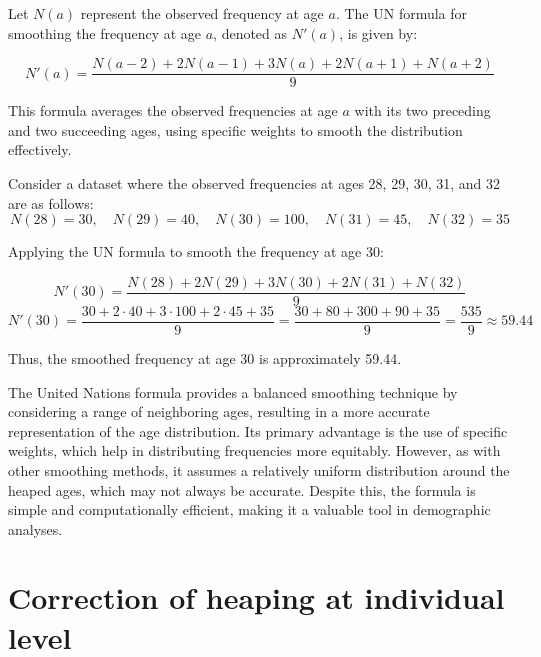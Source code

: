 \documentclass[pdflatex,sn-mathphys-num]{sn-jnl}%
\theoremstyle{thmstyleone}%
\theoremstyle{thmstyletwo}%
\theoremstyle{thmstylethree}%
\begin{document}
Let \( N(a) \) represent the observed frequency at age \( a \). The UN formula for smoothing the frequency at age \( a \), denoted as \( N'(a) \), is given by:

\[
N'(a) = \frac{N(a-2) + 2N(a-1) + 3N(a) + 2N(a+1) + N(a+2)}{9}
\]

This formula averages the observed frequencies at age \( a \) with its two preceding and two succeeding ages, using specific weights to smooth the distribution effectively.

Consider a dataset where the observed frequencies at ages 28, 29, 30, 31, and 32 are as follows:
\[
N(28) = 30, \quad N(29) = 40, \quad N(30) = 100, \quad N(31) = 45, \quad N(32) = 35
\]

Applying the UN formula to smooth the frequency at age 30:

\[
N'(30) = \frac{N(28) + 2N(29) + 3N(30) + 2N(31) + N(32)}{9}
\]
\[
N'(30) = \frac{30 + 2 \cdot 40 + 3 \cdot 100 + 2 \cdot 45 + 35}{9} = \frac{30 + 80 + 300 + 90 + 35}{9} = \frac{535}{9} \approx 59.44
\]

Thus, the smoothed frequency at age 30 is approximately 59.44.

The United Nations formula provides a balanced smoothing technique by considering a range of neighboring ages, resulting in a more accurate representation of the age distribution. Its primary advantage is the use of specific weights, which help in distributing frequencies more equitably. However, as with other smoothing methods, it assumes a relatively uniform distribution around the heaped ages, which may not always be accurate. Despite this, the formula is simple and computationally efficient, making it a valuable tool in demographic analyses.


\section{Correction of heaping at individual level}
\end{document}
